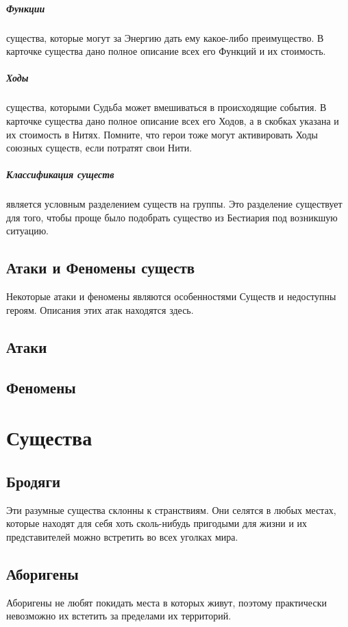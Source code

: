 \paragraph{Функции} существа, которые могут за Энергию дать ему какое-либо преимущество. В карточке существа дано полное описание всех его Функций и их стоимость.
\paragraph{Ходы} существа, которыми Судьба может вмешиваться в происходящие события. В карточке существа дано полное описание всех его Ходов, а в скобках указана и их стоимость в Нитях. Помните, что герои тоже могут активировать Ходы союзных существ, если потратят свои Нити.
\paragraph{Классификация существ} является условным разделением существ на группы. Это разделение существует для того, чтобы проще было подобрать существо из Бестиария под возникшую ситуацию.

\section{Атаки и Феномены существ}
Некоторые атаки и феномены являются особенностями Существ и недоступны героям. Описания этих атак находятся здесь.
\section{Атаки}
\section{Феномены}

\chapter{Существа}
\section{Бродяги}
Эти разумные существа склонны к странствиям. Они селятся в любых местах, которые находят для себя хоть сколь-нибудь пригодыми для жизни и их представителей можно встретить во всех уголках мира.

\section{Аборигены}
Аборигены не любят покидать места в которых живут, поэтому практически невозможно их встетить за пределами их территорий.

